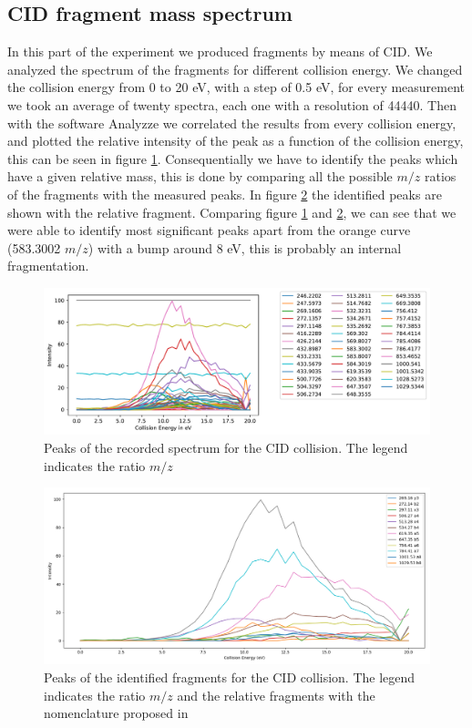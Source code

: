 \documentclass[a4paper,10pt]{article}
\begin{document}
\subsection{CID fragment mass spectrum}
In this part of the experiment we produced fragments by means of CID. We analyzed the spectrum of the fragments for  different collision energy. %
We changed the collision energy from 0 to 20 eV, with a step of 0.5 eV, for every measurement we took an average of twenty spectra, each one with a resolution of 44440. Then with the software Analyzze we correlated the results from every collision energy, and plotted the relative intensity of the peak as a function of the collision energy, this can be seen in figure \ref{cidcollision}.
Consequentially we have to identify the peaks which have a given relative mass, this is done by comparing all the possible $m/z$ ratios of the fragments with the measured peaks. In figure \ref{cidcollisionidentified} the identified peaks are shown with the relative fragment. Comparing figure \ref{cidcollision} and \ref{cidcollisionidentified}, we can see that we were able to identify most significant peaks apart from the orange curve (583.3002 $m/z$) with a bump around 8 eV, this is probably an internal fragmentation.
\begin{figure}[H]
	\centering
	\includegraphics[width = \textwidth]{cid_collision}
	\caption{Peaks of the recorded spectrum for the CID collision. The legend indicates the ratio $m/z$}
	\label{cidcollision}
\end{figure}
\begin{figure}[H]
	\centering
	\includegraphics[width = \textwidth]{identifiedcid}
	\caption{Peaks of the identified fragments for the CID collision. The legend indicates the ratio $m/z$ and the relative fragments with the nomenclature proposed in \cite{fragmentsnomenclature}}
	\label{cidcollisionidentified}
\end{figure}
\end{document}
